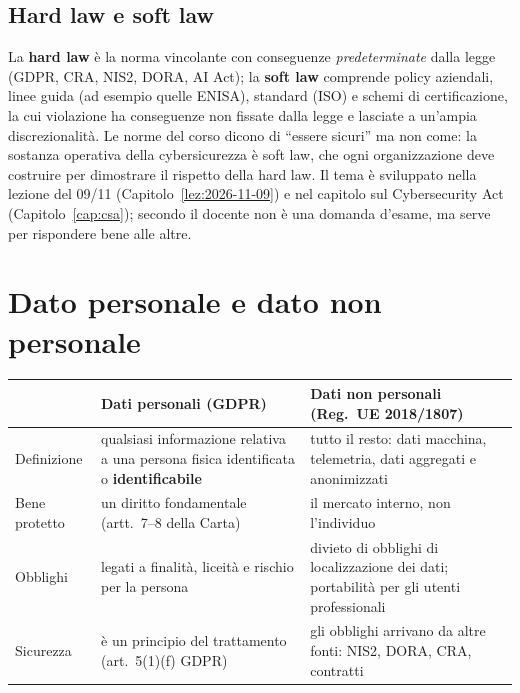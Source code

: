 \subsection{Hard law e soft law}
\label{sec:intro-hard-soft}
La \textbf{hard law} è la norma vincolante con conseguenze \emph{predeterminate} dalla legge (GDPR, CRA,
NIS2, DORA, AI Act); la \textbf{soft law} comprende policy aziendali, linee guida (ad esempio quelle
ENISA), standard (ISO) e schemi di certificazione, la cui violazione ha conseguenze non fissate dalla
legge e lasciate a un'ampia discrezionalità. Le norme del corso dicono di ``essere sicuri'' ma non come:
la sostanza operativa della cybersicurezza è soft law, che ogni organizzazione deve costruire per
dimostrare il rispetto della hard law. Il tema è sviluppato nella lezione del 09/11
(Capitolo~\ref{lez:2026-11-09}) e nel capitolo sul Cybersecurity Act (Capitolo~\ref{cap:csa}); secondo
il docente non è una domanda d'esame, ma serve per rispondere bene alle altre.

\section{Dato personale e dato non personale}
\label{sec:intro-dati}

\begin{center}
\small
\begin{tabularx}{\linewidth}{>{\raggedright\arraybackslash}p{2.6cm} X X}
\toprule
 & \textbf{Dati personali (GDPR)} & \textbf{Dati non personali (Reg.~UE 2018/1807)}\\
\midrule
Definizione & qualsiasi informazione relativa a una persona fisica identificata o
  \textbf{identificabile} & tutto il resto: dati macchina, telemetria, dati aggregati e anonimizzati\\
Bene protetto & un diritto fondamentale (artt.~7--8 della Carta) & il mercato interno, non l'individuo\\
Obblighi & legati a finalità, liceità e rischio per la persona & divieto di obblighi di localizzazione
  dei dati; portabilità per gli utenti professionali\\
Sicurezza & è un principio del trattamento (art.~5(1)(f) GDPR) & gli obblighi arrivano da altre fonti:
  NIS2, DORA, CRA, contratti\\
\bottomrule
\end{tabularx}
\end{center}

